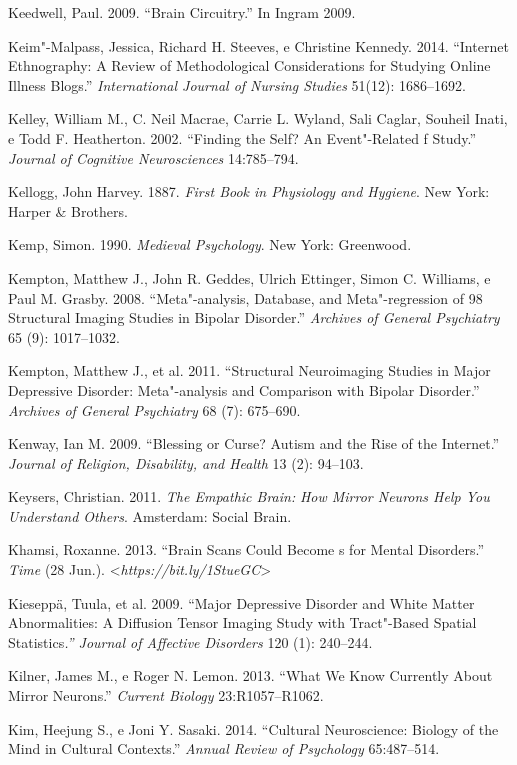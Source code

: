 {\begin{Parskip}
Keedwell, Paul. 2009. ``Brain Circuitry.'' In Ingram 2009.

Keim"-Malpass, Jessica, Richard H. Steeves, e Christine Kennedy. 2014.
``Internet Ethnography: A Review of Methodological Considerations for
Studying Online Illness Blogs.'' \emph{International Journal of Nursing
Studies} 51(12): 1686--1692.

Kelley, William M., C. Neil Macrae, Carrie L. Wyland, Sali Caglar,
Souheil Inati, e Todd F. Heatherton. 2002. ``Finding the Self? An
Event"-Related f Study.'' \emph{Journal of Cognitive Neurosciences}
14:785--794.

Kellogg, John Harvey. 1887. \emph{First Book in Physiology and Hygiene}.
New York: Harper \& Brothers.

Kemp, Simon. 1990. \emph{Medieval Psychology}. New York: Greenwood.

Kempton, Matthew J., John R. Geddes, Ulrich Ettinger, Simon C. Williams,
e Paul M. Grasby. 2008. ``Meta"-analysis, Database, and Meta"-regression
of 98 Structural Imaging Studies in Bipolar Disorder.'' \emph{Archives
of General Psychiatry} 65 (9): 1017--1032.

Kempton, Matthew J., et al. 2011. ``Structural Neuroimaging Studies in
Major Depressive Disorder: Meta"-analysis and Comparison with Bipolar
Disorder.'' \emph{Archives of General Psychiatry} 68 (7): 675--690.

Kenway, Ian M. 2009. ``Blessing or Curse? Autism and the Rise of the
Internet.'' \emph{Journal of Religion, Disability, and Health} 13 (2):
94--103.

Keysers, Christian. 2011. \emph{The Empathic Brain:} \emph{How Mirror
Neurons Help You Understand Others}. Amsterdam: Social Brain.

Khamsi, Roxanne. 2013. ``Brain Scans Could Become s for Mental
Disorders.'' \emph{Time} (28 Jun.).
\textless{}\emph{https://bit.ly/1StueGC}\textgreater{}

Kieseppä, Tuula, et al. 2009. ``Major Depressive Disorder and White
Matter Abnormalities: A Diffusion Tensor Imaging Study with Tract"-Based
Spatial Statistics\emph{.'' Journal of Affective Disorders} 120 (1):
240--244.

Kilner, James M., e Roger N. Lemon. 2013. ``What We Know Currently About
Mirror Neurons.'' \emph{Current Biology} 23:R1057--R1062.

Kim, Heejung S., e Joni Y. Sasaki. 2014. ``Cultural Neuroscience:
Biology of the Mind in Cultural Contexts.'' \emph{Annual Review of
Psychology} 65:487--514.


\end{Parskip}}
